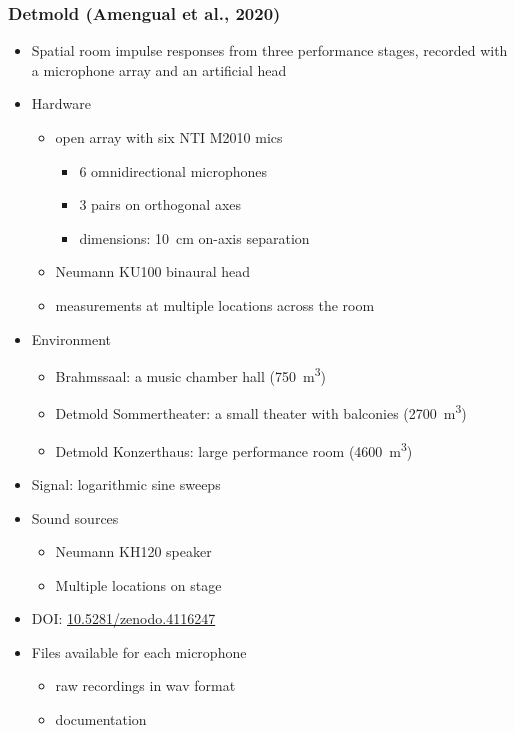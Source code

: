 \documentclass[14pt, oneside]{extarticle}
\begin{document}
\subsubsection{Detmold (Amengual et al., 2020)}

\begin{itemize}

\item Spatial room impulse responses from three performance stages, recorded with a microphone array and an artificial head \cite{amengual2020open}

\item Hardware
	\begin{itemize}
	\item open array with six NTI M2010 mics
		\begin{itemize}
		\item 6 omnidirectional microphones 
		\item 3 pairs on orthogonal axes	
		\item dimensions: \SI{10}{\centi\metre} on-axis separation
		\end{itemize}
	\item Neumann KU100 binaural head
	\item measurements at multiple locations across the room
	\end{itemize}

\item Environment
	\begin{itemize}
	\item Brahmssaal: a music chamber hall (\SI{750}{\cubic\metre})
	\item Detmold Sommertheater: a small theater with balconies (\SI{2700}{\cubic\metre})
	\item Detmold Konzerthaus: large performance room (\SI{4600}{\cubic\metre})
	\end{itemize}

\item Signal: logarithmic sine sweeps

\item Sound sources
	\begin{itemize}
	\item Neumann KH120 speaker
	\item Multiple locations on stage
	\end{itemize}

\item DOI: \href{https://zenodo.org/record/4116247}{10.5281/zenodo.4116247} 

\item Files available for each microphone
	\begin{itemize}
	\item raw recordings in wav format
	\item documentation
	\end{itemize}

\end{itemize}
\end{document}
